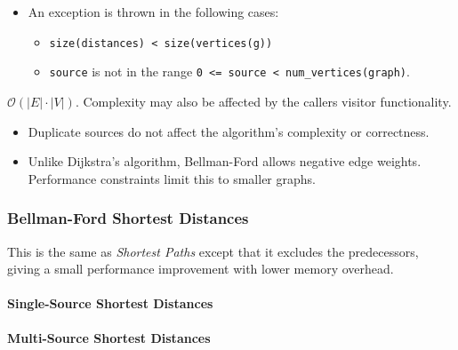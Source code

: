 \begin{itemdescr}
\begin{itemize}
            \end{itemize}
      \pnum\throws 
            \begin{itemize}
                  \item An  exception is thrown in the following cases:
                        \begin{itemize}
                              \item \lstinline{size(distances) < size(vertices(g))}
                              \item \lstinline{source} is not in the range \lstinline{0 <= source < num_vertices(graph)}.
                        \end{itemize}
            \end{itemize}
      \pnum\complexity $\mathcal{O}(|E| \cdot |V|)$. Complexity may also be affected by the callers visitor functionality. \\
      \pnum\remarks 
            \begin{itemize}
                  \item Duplicate sources do not affect the algorithm's complexity or correctness.
                  \item Unlike Dijkstra's algorithm, Bellman-Ford allows negative edge weights. 
                        Performance constraints limit this to smaller graphs.
            \end{itemize}
\end{itemdescr}

\subsubsection{Bellman-Ford Shortest Distances}

This is the same as \textit{Shortest Paths} except that it excludes the predecessors,
giving a small performance improvement with lower memory overhead.

\paragraph{Single-Source Shortest Distances}
{\small
      
}

\paragraph{Multi-Source Shortest Distances}
{\small
      
}

